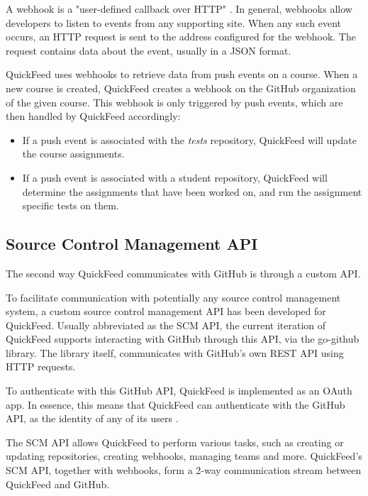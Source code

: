 A webhook is a "user-defined callback over HTTP" \cite{webhook}. 
In general, webhooks allow developers to listen to events from any supporting site.
When any such event occurs, an HTTP request is sent to the address configured for the webhook.
The request contains data about the event, usually in a JSON format.

QuickFeed uses webhooks to retrieve data from push events on a course.
When a new course is created, QuickFeed creates a webhook on the GitHub organization of the given course.
This webhook is only triggered by push events, which are then handled by QuickFeed accordingly:

\begin{itemize}
    \item If a push event is associated with the \textit{tests} repository, QuickFeed will update the course assignments.
    \item If a push event is associated with a student repository, QuickFeed will determine the assignments that have been worked on,
    and run the assignment specific tests on them.
\end{itemize}

\subsection{Source Control Management API}
\label{sec:scm}

The second way QuickFeed communicates with GitHub is through a custom API.

To facilitate communication with potentially any source control management system, a custom source control management API has been developed for QuickFeed.
Usually abbreviated as the SCM API, the current iteration of QuickFeed supports interacting with GitHub through this API, via the go-github library.
The library itself, communicates with GitHub's own REST API using HTTP requests.

To authenticate with this GitHub API, QuickFeed is implemented as an OAuth app.
In essence, this means that QuickFeed can authenticate with the GitHub API, as the identity of any of its users \cite{apps}.

The SCM API allows QuickFeed to perform various tasks, such as creating or updating repositories, creating webhooks, managing teams and more.
QuickFeed's SCM API, together with webhooks, form a 2-way communication stream between QuickFeed and GitHub.